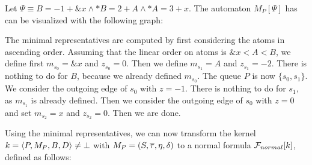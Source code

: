 \begin{example}
    Let $\Psi \equiv B = -1 + \&x \land *B = 2 + A \land *A = 3 + x$.
    The automaton $M_P[\Psi]$ has can be visualized with the following graph:
    \begin{center}
    \end{center}
    The minimal representatives are computed by first considering the atoms in ascending order.
    Assuming that the linear order on atoms is $\&x < A < B$,
    we define first $m_{s_0} = \&x$ and $z_{s_0} = 0$.
    Then we define $m_{s_1} = A$ and $z_{s_1} = -2$.
    There is nothing to do for $B$, because we already defined $m_{s_0}$.
    The queue $P$ is now $\{s_0, s_1\}$.
    We consider the outgoing edge of $s_0$ with $z = -1$.
    There is nothing to do for $s_1$, as $m_{s_1}$ is already defined.
    Then we consider the outgoing edge of $s_0$ with $z = 0$
    and set $m_{s_2} = x$ and $z_{s_2} = 0$.
    Then we are done.
\end{example}
Using the minimal representatives, we can now transform the kernel $k = \langle P,M_P,B,D\rangle \neq \bot$ with $M_P = (S, \overline{\tau}, \eta, \delta)$ to a normal formula $\mathcal{F}_{normal}[k]$,
defined as follows:

